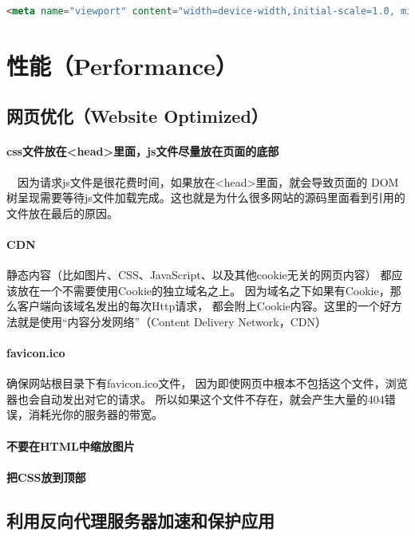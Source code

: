 \documentclass{book}
\begin{document}
\begin{lstlisting}[language=HTML]
<meta name="viewport" content="width=device-width,initial-scale=1.0, minimum-scale=1.0, maximum-scale=1.0, user-scalable=no"/>
\end{lstlisting}



\section{性能（Performance）}

\subsection{网页优化（Website Optimized）}

\paragraph{css文件放在<head>里面，js文件尽量放在页面的底部}~~因为请求js文件是很花费时间，如果放在<head>里面，就会导致页面的 DOM树呈现需要等待js文件加载完成。这也就是为什么很多网站的源码里面看到引用的文件放在最后的原因。

\paragraph{CDN}静态内容（比如图片、CSS、JavaScript、以及其他cookie无关的网页内容）
都应该放在一个不需要使用Cookie的独立域名之上。
因为域名之下如果有Cookie，那么客户端向该域名发出的每次Http请求，
都会附上Cookie内容。这里的一个好方法就是使用“内容分发网络”（Content Delivery Network，CDN）

\paragraph{favicon.ico}确保网站根目录下有favicon.ico文件，
因为即使网页中根本不包括这个文件，浏览器也会自动发出对它的请求。
所以如果这个文件不存在，就会产生大量的404错误，消耗光你的服务器的带宽。

\paragraph{不要在HTML中缩放图片}

\paragraph{把CSS放到顶部}

\subsection{利用反向代理服务器加速和保护应用}
\end{document}
